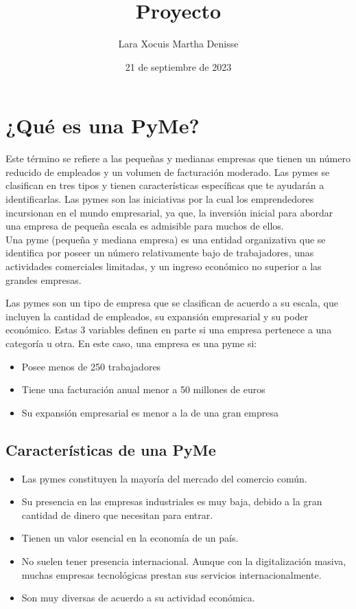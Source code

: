 \documentclass[letterpaper,12pt]{article}
\title {\textbf{Proyecto}}
\author{Lara Xocuis Martha Denisse}
\date{21 de septiembre de 2023}
\begin{document}
\maketitle

\begin{sloppypar}
\section{¿Qué es una PyMe?}
Este término se refiere a las pequeñas y medianas empresas que tienen un número reducido de empleados y un volumen de facturación moderado. Las pymes se clasifican en tres tipos y tienen características específicas que te ayudarán a identificarlas. Las pymes son las iniciativas por la cual los emprendedores incursionan en el mundo empresarial, ya que, la inversión inicial para abordar una empresa de pequeña escala es admisible para muchos de ellos.
\vspace{0.3cm}\\ 
Una pyme (pequeña y mediana empresa) es una entidad organizativa que se identifica por poseer un número relativamente bajo de trabajadores, unas actividades comerciales limitadas, y un ingreso económico no superior a las grandes empresas.

Las pymes son un tipo de empresa que se clasifican de acuerdo a su escala, que incluyen la cantidad de empleados, su expansión empresarial y su poder económico. Estas 3 variables definen en parte si una empresa pertenece a una categoría u otra. En este caso, una empresa es una pyme si:

\begin{itemize}
    \item Posee menos de 250 trabajadores 
    \item Tiene una facturación anual menor a 50 millones de euros 
    \item Su expansión empresarial es menor a la de una gran empresa
\end{itemize}
\subsection{Características de una PyMe}
\begin{itemize}
    \item Las pymes constituyen la mayoría del mercado del comercio común.
    \item Su presencia en las empresas industriales es muy baja, debido a la gran cantidad de dinero que necesitan para entrar.
    \item Tienen un valor esencial en la economía de un país.
    \item No suelen tener presencia internacional. Aunque con la digitalización masiva, muchas empresas tecnológicas prestan sus servicios internacionalmente.
    \item Son muy diversas de acuerdo a su actividad económica.
\end{itemize}

\end{sloppypar}
\end{document}
